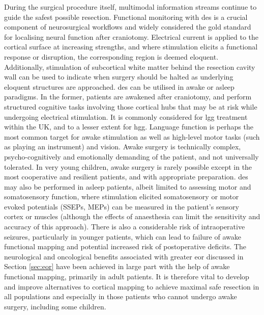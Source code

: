During the surgical procedure itself, multimodal information streams continue to guide the safest possible resection.
Functional monitoring with \gls{des} is a crucial component of neurosurgical workflows and widely considered the gold standard for localising neural function after craniotomy.
Electrical current is applied to the cortical surface at increasing strengths\autocite{Saito2015}, and where stimulation elicits a functional response or disruption, the corresponding region is deemed eloquent.
Additionally, stimulation of subcortical white matter behind the resection cavity wall can be used to indicate when surgery should be halted as underlying eloquent structures are approached\autocite{Sala2019}.
\Gls{des} can be utilised in awake or asleep paradigms.
In the former, patients are awakened after craniotomy, and perform structured cognitive tasks involving those cortical hubs that may be at risk while undergoing electrical stimulation.
It is commonly considered for \gls{lgg} treatment within the UK, and to a lesser extent for \gls{hgg}\autocite{WykesV.2017}.
Language function is perhaps the most common target for awake stimulation as well as high-level motor tasks (such as playing an instrument) and vision\autocite{Mazerand2017}.
Awake surgery is technically complex, psycho-cognitively and emotionally demanding of the patient, and not universally tolerated\autocite{Nossek2013a,Wang2019}.
In very young children, awake surgery is rarely possible except in the most cooperative and resilient patients, and with appropriate preparation\autocite{Zolotova2022}.
\Gls{des} may also be performed in asleep patients, albeit limited to assessing motor and somatosensory function, where stimulation elicited somatosensory or motor evoked potentials (SSEPs, MEPs) can be measured in the patient's sensory cortex or muscles\autocite{Stone2019} (although the effects of anaesthesia can limit the sensitivity and accuracy of this approach\autocite{Stone2019,WeissLucas2020}).
There is also a considerable risk of intraoperative seizures, particularly in younger patients, which can lead to failure of awake functional mapping and potential increased risk of postoperative deficits\autocite{Nossek2013,Wang2019,Rigolo2020a}.
The neurological and oncological benefits associated with greater \gls{eor} discussed in Section \ref{sec:eor} have been achieved in large part with the help of awake functional mapping, primarily in adult patients.
It is therefore vital to develop and improve alternatives to cortical mapping to achieve maximal safe resection in all populations and especially in those patients who cannot undergo awake surgery, including some children.

